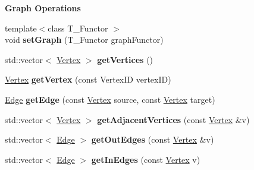 \begin{Indent}{\bf Graph Operations}\par
\begin{DoxyCompactItemize}
\item 
\hypertarget{structgraybat_1_1Cage_adeb898f46486654a94ee8198d31272fb}{}{\footnotesize template$<$class T\+\_\+\+Functor $>$ }\\void {\bfseries set\+Graph} (T\+\_\+\+Functor graph\+Functor)\label{structgraybat_1_1Cage_adeb898f46486654a94ee8198d31272fb}

\item 
\hypertarget{structgraybat_1_1Cage_a2e4558e1f636d7e6db3f0a1fce63a6fb}{}std\+::vector$<$ \hyperlink{structgraybat_1_1CommunicationVertex}{Vertex} $>$ {\bfseries get\+Vertices} ()\label{structgraybat_1_1Cage_a2e4558e1f636d7e6db3f0a1fce63a6fb}

\item 
\hypertarget{structgraybat_1_1Cage_a1e979baa57c86526fab054a731f59b32}{}\hyperlink{structgraybat_1_1CommunicationVertex}{Vertex} {\bfseries get\+Vertex} (const Vertex\+I\+D vertex\+I\+D)\label{structgraybat_1_1Cage_a1e979baa57c86526fab054a731f59b32}

\item 
\hypertarget{structgraybat_1_1Cage_afe51aef46fbc4e1f2c3c62fcfee15126}{}\hyperlink{structgraybat_1_1CommunicationEdge}{Edge} {\bfseries get\+Edge} (const \hyperlink{structgraybat_1_1CommunicationVertex}{Vertex} source, const \hyperlink{structgraybat_1_1CommunicationVertex}{Vertex} target)\label{structgraybat_1_1Cage_afe51aef46fbc4e1f2c3c62fcfee15126}

\item 
\hypertarget{structgraybat_1_1Cage_ad8bc02fb9875ce4a66e7cfb7d8cbbd99}{}std\+::vector$<$ \hyperlink{structgraybat_1_1CommunicationVertex}{Vertex} $>$ {\bfseries get\+Adjacent\+Vertices} (const \hyperlink{structgraybat_1_1CommunicationVertex}{Vertex} \&v)\label{structgraybat_1_1Cage_ad8bc02fb9875ce4a66e7cfb7d8cbbd99}

\item 
\hypertarget{structgraybat_1_1Cage_a21621e29fa96e5334eca259f5ca09b9f}{}std\+::vector$<$ \hyperlink{structgraybat_1_1CommunicationEdge}{Edge} $>$ {\bfseries get\+Out\+Edges} (const \hyperlink{structgraybat_1_1CommunicationVertex}{Vertex} \&v)\label{structgraybat_1_1Cage_a21621e29fa96e5334eca259f5ca09b9f}

\item 
\hypertarget{structgraybat_1_1Cage_a8d8873582c6499be4ae375f0d689c2be}{}std\+::vector$<$ \hyperlink{structgraybat_1_1CommunicationEdge}{Edge} $>$ {\bfseries get\+In\+Edges} (const \hyperlink{structgraybat_1_1CommunicationVertex}{Vertex} v)\label{structgraybat_1_1Cage_a8d8873582c6499be4ae375f0d689c2be}

\end{DoxyCompactItemize}
\end{Indent}
